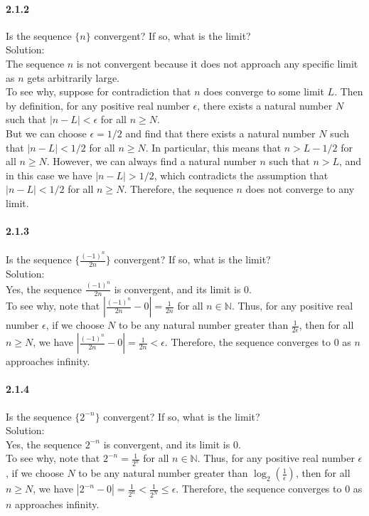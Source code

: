 \documentclass{article}
\begin{document}
\paragraph{2.1.2}
Is the sequence $\{n\}$ convergent? If so, what is the limit?\\
Solution:\\
The sequence ${n}$ is not convergent because it does not approach any specific limit as $n$ gets arbitrarily large.\\
To see why, suppose for contradiction that ${n}$ does converge to some limit $L$. Then by definition, for any positive real number $\epsilon$, there exists a natural number $N$ such that $|n - L| < \epsilon$ for all $n \geq N$.\\
But we can choose $\epsilon = 1/2$ and find that there exists a natural number $N$ such that $|n - L| < 1/2$ for all $n \geq N$. In particular, this means that $n > L - 1/2$ for all $n \geq N$. However, we can always find a natural number $n$ such that $n > L$, and in this case we have $|n - L| > 1/2$, which contradicts the assumption that $|n - L| < 1/2$ for all $n \geq N$. Therefore, the sequence ${n}$ does not converge to any limit.
\paragraph{2.1.3}
Is the sequence $\{\frac{(-1)^n}{2n}\}$ convergent? If so, what is the limit?\\
Solution:\\
Yes, the sequence ${\frac{(-1)^n}{2n}}$ is convergent, and its limit is 0.\\
To see why, note that $|\frac{(-1)^n}{2n} - 0| = \frac{1}{2n}$ for all $n \in \mathbb{N}$. Thus, for any positive real number $\epsilon$, if we choose $N$ to be any natural number greater than $\frac{1}{2\epsilon}$, then for all $n \geq N$, we have $|\frac{(-1)^n}{2n} - 0| = \frac{1}{2n} < \epsilon$. Therefore, the sequence converges to 0 as $n$ approaches infinity.
\paragraph{2.1.4}
Is the sequence $\{2^{-n}\}$ convergent? If so, what is the limit?\\
Solution:\\
Yes, the sequence ${2^{-n}}$ is convergent, and its limit is 0.\\
To see why, note that $2^{-n} = \frac{1}{2^n}$ for all $n \in \mathbb{N}$. Thus, for any positive real number $\epsilon$, if we choose $N$ to be any natural number greater than $\log_2(\frac{1}{\epsilon})$, then for all $n \geq N$, we have $|2^{-n} - 0| = \frac{1}{2^n} < \frac{1}{2^N} \leq \epsilon$. Therefore, the sequence converges to 0 as $n$ approaches infinity.
\end{document}
